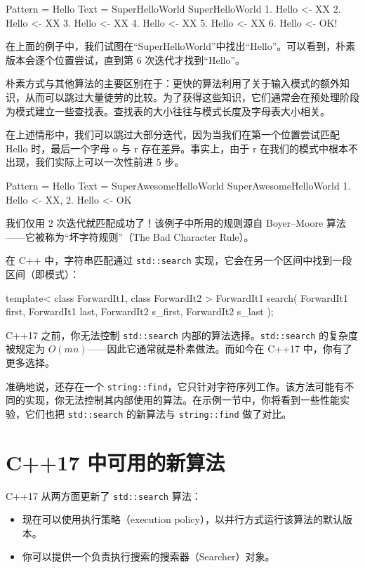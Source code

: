 \begin{codebox}[cpp]
Pattern = Hello
Text = SuperHelloWorld
SuperHelloWorld
1. Hello <- XX
2.
Hello <- XX
3.
Hello <- XX
4.
Hello <- XX
5.
Hello <- XX
6.
Hello <- OK!
\end{codebox}

在上面的例子中，我们试图在“SuperHelloWorld”中找出“Hello”。可以看到，朴素版本会逐个位置尝试，直到第 6 次迭代才找到“Hello”。

朴素方式与其他算法的主要区别在于：更快的算法利用了关于输入模式的额外知识，从而可以跳过大量徒劳的比较。为了获得这些知识，它们通常会在预处理阶段为模式建立一些查找表。查找表的大小往往与模式长度及字母表大小相关。

在上述情形中，我们可以跳过大部分迭代，因为当我们在第一个位置尝试匹配 Hello 时，最后一个字母 o 与 r 存在差异。事实上，由于 r 在我们的模式中根本不出现，我们实际上可以一次性前进 5 步。

\begin{codebox}[cpp]
Pattern = Hello
Text = SuperAwesomeHelloWorld
SuperAwesomeHelloWorld
1. Hello <- XX,
2.
Hello <- OK
\end{codebox}

我们仅用 2 次迭代就匹配成功了！该例子中所用的规则源自 Boyer–Moore 算法——它被称为“坏字符规则”（The Bad Character Rule）。

在 C++ 中，字符串匹配通过 \texttt{std::search} 实现，它会在另一个区间中找到一段区间（即模式）：

\begin{codebox}[cpp]
template< class ForwardIt1, class ForwardIt2 >
ForwardIt1 search( ForwardIt1 first, ForwardIt1 last,
ForwardIt2 s_first, ForwardIt2 s_last );
\end{codebox}

C++17 之前，你无法控制 \texttt{std::search} 内部的算法选择。\texttt{std::search} 的复杂度被规定为 $O(mn)$——因此它通常就是朴素做法。而如今在 C++17 中，你有了更多选择。

准确地说，还存在一个 \texttt{string::find}，它只针对字符序列工作。该方法可能有不同的实现，你无法控制其内部使用的算法。在示例一节中，你将看到一些性能实验，它们也把 \texttt{std::search} 的新算法与 \texttt{string::find} 做了对比。

\section{C++17 中可用的新算法}

C++17 从两方面更新了 \texttt{std::search} 算法：

\begin{itemize}
\item 现在可以使用执行策略（execution policy），以并行方式运行该算法的默认版本。
\item 你可以提供一个负责执行搜索的搜索器（Searcher）对象。
\end{itemize}

